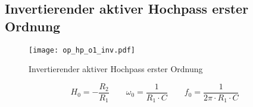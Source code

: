



\subsection{Invertierender aktiver Hochpass erster Ordnung}
\label{filt:o1-hp}
\begin{figure}[h!]
	\centering
	\texttt{[image: op\_hp\_o1\_inv.pdf]}
	\caption{Invertierender aktiver Hochpass erster Ordnung}
	\label{sch:op-hp-o1-inv}
\end{figure}
\[ H_0 = - \frac{R_2}{R_1} \qquad
\omega_0 = \frac{1}{R_1 \cdot C} \qquad
f_0 = \frac{1}{2 \pi \cdot R_1 \cdot C} \]